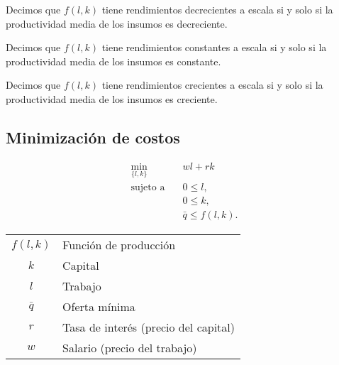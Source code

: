 \documentclass[8pt,a4paper]{extarticle}
\begin{document}
\begin{multicols}{3}
\sectionbreak

\begin{boxprop}
	Decimos que $f(l, k)$ tiene rendimientos decrecientes a escala si y solo si la productividad media de los insumos es decreciente.
\end{boxprop}

\begin{boxprop}                                                                                                                                  
    Decimos que $f(l, k)$ tiene rendimientos constantes a escala si y solo si la productividad media de los insumos es constante.        
\end{boxprop}

\begin{boxprop}                                                                                                                                  
    Decimos que $f(l, k)$ tiene rendimientos crecientes a escala si y solo si la productividad media de los insumos es creciente.        
\end{boxprop}

\newpage

\subsection{Minimización de costos}

\begin{equation*}
\begin{aligned}
    \min_{\{l, k\}}\      & wl + rk \\
    \text{sujeto a} \quad & 0 \le l, \\
                          & 0 \le k, \\
						  & \bar{q} \le f(l, k).
\end{aligned}
\end{equation*}

\begin{center}
\begin{tabular}{ c l }
    \hline
	$f(l, k)$ & Función de producción \\
    $k$ & Capital \\
    $l$ & Trabajo \\
	$\bar{q}$ & Oferta mínima \\
	$r$ & Tasa de interés (precio del capital) \\
	$w$ & Salario (precio del trabajo) \\
    \hline
\end{tabular}
\end{center}


\end{multicols}
\end{document}
